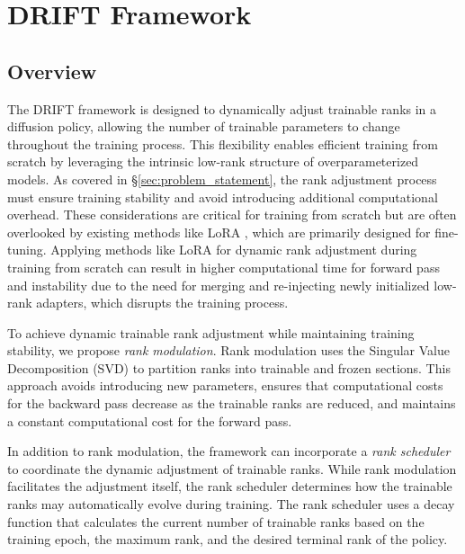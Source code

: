 \section{DRIFT Framework}
\label{sec:drift_framework}

\subsection{Overview}
The DRIFT framework is designed to dynamically adjust trainable ranks in a diffusion policy, allowing the number of trainable parameters to change throughout the training process. This flexibility enables efficient training from scratch by leveraging the intrinsic low-rank structure of overparameterized models. As covered in \S\ref{sec:problem_statement}, the rank adjustment process must ensure training stability and avoid introducing additional computational overhead. These considerations are critical for training from scratch but are often overlooked by existing methods like LoRA \cite{hu_lora}, which are primarily designed for fine-tuning. Applying methods like LoRA for dynamic rank adjustment during training from scratch can result in higher computational time for forward pass and instability due to the need for merging and re-injecting newly initialized low-rank adapters, which disrupts the training process.

To achieve dynamic trainable rank adjustment while maintaining training stability, we propose \textit{rank modulation}. Rank modulation uses the Singular Value Decomposition (SVD) \cite{strang2022introduction} to partition ranks into trainable and frozen sections. This approach avoids introducing new parameters, ensures that computational costs for the backward pass decrease as the trainable ranks are reduced, and maintains a constant computational cost for the forward pass.

In addition to rank modulation, the framework can incorporate a \textit{rank scheduler} to coordinate the dynamic adjustment of trainable ranks. While rank modulation facilitates the adjustment itself, the rank scheduler determines how the trainable ranks may automatically evolve during training. The rank scheduler uses a decay function that calculates the current number of trainable ranks based on the training epoch, the maximum rank, and the desired terminal rank of the policy.


